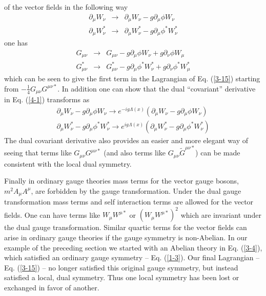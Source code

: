 \documentclass[a4paper,aps]{revtex4}
\begin{document}
of the vector fields in the following way
\begin{eqnarray}
\label{4-1}
\partial _{\mu} W_{\nu} &\rightarrow& \partial _{\mu} W_{\nu}
-g \partial _{\mu} \phi W_{\nu}
\nonumber \\
\partial _{\mu} W_{\nu}^{\ast} &\rightarrow& \partial _{\mu}
W_{\nu} ^{\ast} - g \partial _{\mu} \phi ^{\ast} W_{\nu} ^{\ast}
\end{eqnarray}
one has
\begin{eqnarray}
\label{4-2}
G_{\mu \nu} &\rightarrow& G_{\mu \nu} - g \partial _{\mu} \phi W_{\nu}
+ g \partial _{\nu} \phi W_{\mu}
\nonumber \\ 
G_{\mu \nu}^{\ast} &\rightarrow& G_{\mu \nu} ^{\ast}
- g \partial _{\mu} \phi^{\ast} W_{\nu} ^{\ast}
+ g \partial _{\nu} \phi ^{\ast} W_{\mu}^{\ast}
\end{eqnarray}
which can be seen to give the first term in the Lagrangian
of Eq. (\ref{3-15}) starting from $-\frac{1}{4} G_{\mu \nu}
G^{\mu \nu \ast}$. In addition one can show that
the dual ``covariant'' derivative in Eq. (\ref{4-1}) transforms
as
\begin{eqnarray}
\label{4-3}
\partial _{\mu} W_{\nu} - g \partial _{\mu} \phi
W_{\nu}  \rightarrow
e^{-i g \Lambda(x)} (\partial _{\mu} W_{\nu} - g \partial _{\mu}
\phi W_{\nu})
\\
\partial _{\mu} W_{\nu} ^{\ast} - g \partial _{\mu} \phi ^{\ast}
W_{\nu} ^{\ast} \rightarrow
e^{i g \Lambda(x)} (\partial _{\mu} W_{\nu} ^{\ast} - g \partial _{\mu}
\phi ^{\ast} W_{\nu} ^{\ast})
\end{eqnarray}
The dual covariant derivative also
provides an easier and more elegant way of seeing that terms like
$G_{\mu \nu} G^{\mu \nu \ast}$ (and also terms like $G_{\mu \nu}
\widetilde{G}^{\mu \nu \ast}$) can be made consistent with the local
dual symmetry. 

Finally in ordinary gauge theories mass terms
for the vector gauge bosons, $m^2 A_{\mu} A^{\mu}$, are forbidden
by the gauge transformation.
Under the dual gauge transformation mass terms and
self interaction terms are allowed for the vector fields.
One can have terms like $W_{\mu} W^{\mu \ast}$ or
$(W_{\mu} W^{\mu \ast})^2$ which are invariant under the
dual gauge transformation. Similar quartic terms for the
vector fields can arise in ordinary gauge theories if the
gauge symmetry is non-Abelian. In our example of the preceding
section we started with an Abelian theory in Eq. (\ref{3-4}), which
satisfied an ordinary gauge symmetry -- Eq. (\ref{1-3}). Our final
Lagrangian -- Eq. (\ref{3-15}) -- no longer satisfied this original
gauge symmetry, but instead satisfied a local, dual symmetry. Thus
one local symmetry has been lost or exchanged in favor of another.
\end{document}
